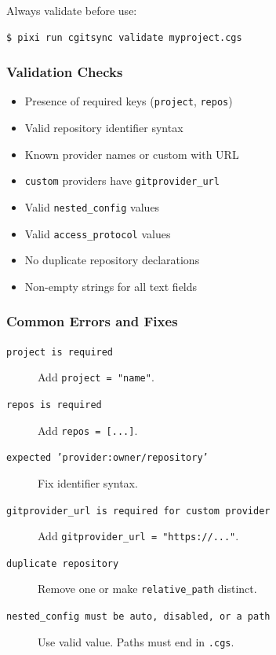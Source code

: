 Always validate before use:

\begin{lstlisting}[language=bash]
$ pixi run cgitsync validate myproject.cgs
\end{lstlisting}

\subsubsection{Validation Checks}

\begin{itemize}
  \item Presence of required keys (\texttt{project}, \texttt{repos})
  \item Valid repository identifier syntax
  \item Known provider names or custom with URL
  \item \texttt{custom} providers have \texttt{gitprovider\_url}
  \item Valid \texttt{nested\_config} values
  \item Valid \texttt{access\_protocol} values
  \item No duplicate repository declarations
  \item Non-empty strings for all text fields
\end{itemize}

\subsubsection{Common Errors and Fixes}

\begin{description}
  \item[\texttt{project is required}] Add \texttt{project = "name"}.
  \item[\texttt{repos is required}] Add \texttt{repos = [...]}. 
  \item[\texttt{expected 'provider:owner/repository'}] Fix identifier syntax.
  \item[\texttt{gitprovider\_url is required for custom provider}]
        Add \texttt{gitprovider\_url = "https://..."}.
  \item[\texttt{duplicate repository}] Remove one or make \texttt{relative\_path}
        distinct.
  \item[\texttt{nested\_config must be auto, disabled, or a path}]
        Use valid value. Paths must end in \texttt{.cgs}.
\end{description}

